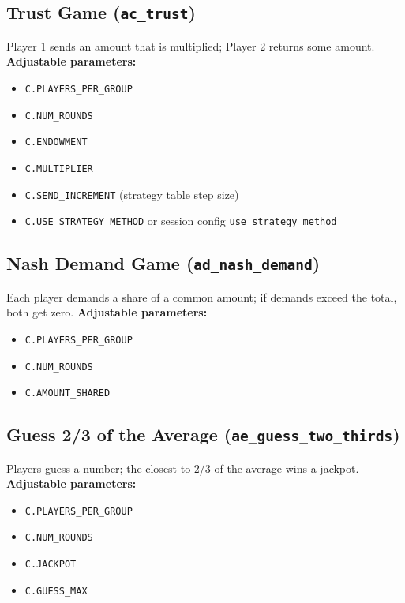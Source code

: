 \documentclass[11pt]{article}
\begin{document}
\subsection*{Trust Game (\texttt{ac\_trust})}
Player 1 sends an amount that is multiplied; Player 2 returns some amount.
\textbf{Adjustable parameters:}
\begin{itemize}
\item \texttt{C.PLAYERS\_PER\_GROUP}
\item \texttt{C.NUM\_ROUNDS}
\item \texttt{C.ENDOWMENT}
\item \texttt{C.MULTIPLIER}
\item \texttt{C.SEND\_INCREMENT} (strategy table step size)
\item \texttt{C.USE\_STRATEGY\_METHOD} or session config \texttt{use\_strategy\_method}
\end{itemize}

\subsection*{Nash Demand Game (\texttt{ad\_nash\_demand})}
Each player demands a share of a common amount; if demands exceed the total,
both get zero.
\textbf{Adjustable parameters:}
\begin{itemize}
\item \texttt{C.PLAYERS\_PER\_GROUP}
\item \texttt{C.NUM\_ROUNDS}
\item \texttt{C.AMOUNT\_SHARED}
\end{itemize}

\subsection*{Guess 2/3 of the Average (\texttt{ae\_guess\_two\_thirds})}
Players guess a number; the closest to 2/3 of the average wins a jackpot.
\textbf{Adjustable parameters:}
\begin{itemize}
\item \texttt{C.PLAYERS\_PER\_GROUP}
\item \texttt{C.NUM\_ROUNDS}
\item \texttt{C.JACKPOT}
\item \texttt{C.GUESS\_MAX}
\end{itemize}
\end{document}

